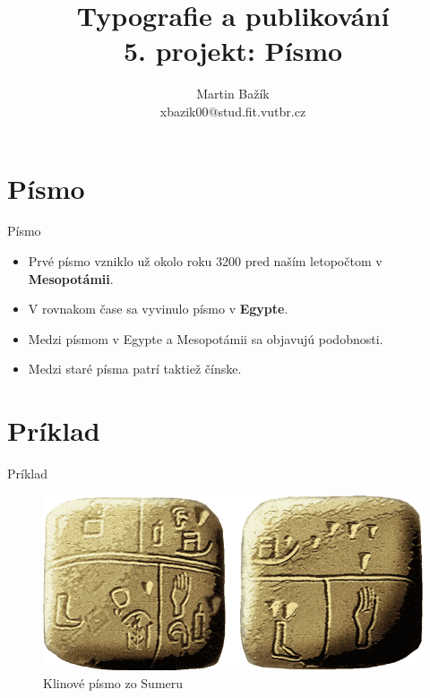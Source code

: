 \documentclass{beamer}
\author{Martin Bažík \\ xbazik00@stud.fit.vutbr.cz}
\title{Typografie a publikování \\ 5. projekt: Písmo}
\begin{document}
	\begin{frame}
		\titlepage
	\end{frame}
	
	\newpage
	
	
	\section{Písmo}
	
	\begin{frame}{Písmo}
		\transwipe
		\begin{itemize}
			\item Prvé písmo vzniklo už okolo roku 3200 pred naším letopočtom v \textbf{Mesopotámii}. 
			\item V rovnakom čase sa vyvinulo písmo v \textbf{Egypte}.
			\item Medzi písmom v Egypte a Mesopotámii sa objavujú podobnosti. 
			\item Medzi staré písma patrí taktiež čínske.
		\end{itemize}
		
		\vskip 1cm
		
		
	\end{frame}
	
	
	
	\section{Príklad}
	
	\begin{frame}{Príklad}
		\transwipe
		\begin{figure}[H]
			\centering
			\includegraphics[scale=0.4]{Tab.png}	
			\caption{Klinové písmo zo Sumeru}
			\label{picKlin}
		\end{figure}
	\end{frame}
	
\end{document}
